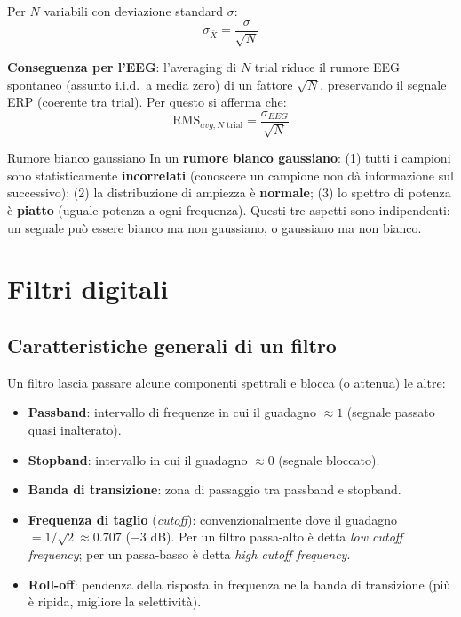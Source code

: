 Per $N$ variabili con deviazione standard $\sigma$:
\[
\sigma_{\bar{X}} = \frac{\sigma}{\sqrt{N}}
\]

\textbf{Conseguenza per l'EEG}: l'averaging di $N$ trial riduce il rumore EEG spontaneo (assunto i.i.d.\ a media zero) di un fattore $\sqrt{N}$, preservando il segnale ERP (coerente tra trial). Per questo si afferma che:
\[
\text{RMS}_{avg, N \text{ trial}} = \frac{\sigma_{EEG}}{\sqrt{N}}
\]

\begin{approfondimento}{Rumore bianco gaussiano}
In un \textbf{rumore bianco gaussiano}: (1) tutti i campioni sono statisticamente \textbf{incorrelati} (conoscere un campione non dà informazione sul successivo); (2) la distribuzione di ampiezza è \textbf{normale}; (3) lo spettro di potenza è \textbf{piatto} (uguale potenza a ogni frequenza). Questi tre aspetti sono indipendenti: un segnale può essere bianco ma non gaussiano, o gaussiano ma non bianco.
\end{approfondimento}

\section{Filtri digitali}

\subsection{Caratteristiche generali di un filtro}

Un filtro lascia passare alcune componenti spettrali e blocca (o attenua) le altre:

\begin{itemize}
    \item \textbf{Passband}: intervallo di frequenze in cui il guadagno $\approx 1$ (segnale passato quasi inalterato).
    \item \textbf{Stopband}: intervallo in cui il guadagno $\approx 0$ (segnale bloccato).
    \item \textbf{Banda di transizione}: zona di passaggio tra passband e stopband.
    \item \textbf{Frequenza di taglio} (\textit{cutoff}): convenzionalmente dove il guadagno $= 1/\sqrt{2} \approx 0.707$ ($-3$ dB). Per un filtro passa-alto è detta \textit{low cutoff frequency}; per un passa-basso è detta \textit{high cutoff frequency}.
    \item \textbf{Roll-off}: pendenza della risposta in frequenza nella banda di transizione (più è ripida, migliore la selettività).
\end{itemize}

